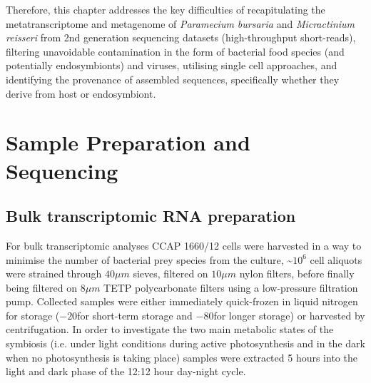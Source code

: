 Therefore, this chapter addresses the key difficulties of recapitulating the metatranscriptome and metagenome of \textit{Paramecium bursaria}
and \textit{Micractinium reisseri} from 2nd generation sequencing datasets (high-throughput short-reads), filtering unavoidable contamination
in the form of bacterial food species (and potentially endosymbionts) and viruses, utilising single cell approaches,
and identifying the provenance of assembled sequences, specifically whether they derive from host or endosymbiont.



%
%


\section{Sample Preparation and Sequencing}

\subsection{Bulk transcriptomic RNA preparation}
For bulk transcriptomic analyses CCAP 1660/12 cells were harvested in a way to minimise the 
number of bacterial prey species from the culture, \textasciitilde \(10^{6}\) 
cell aliquots were strained through \(40\mu m\) sieves, filtered on 
\(10 \mu m\) nylon filters, 
before finally being filtered on \(8 \mu m\) TETP polycarbonate filters using a 
low-pressure filtration pump.  Collected samples were either immediately 
quick-frozen in liquid nitrogen for storage (\(-20\)\celsius for short-term storage 
and \(-80\)\celsius for longer storage) or harvested by centrifugation.  
In order to investigate the two main metabolic states of the symbiosis 
(i.e. under light conditions during active photosynthesis and in the dark 
when no photosynthesis is taking place) samples were extracted 5 hours into 
the light and dark phase of the 12:12 hour day-night cycle.

